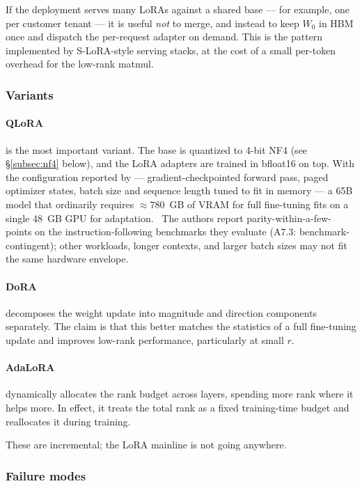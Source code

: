 If the deployment serves many LoRAs against a shared base --- for
example, one per customer tenant --- it is useful \emph{not} to
merge, and instead to keep $W_0$ in HBM once and dispatch the
per-request adapter on demand. This is the pattern implemented by
S-LoRA-style serving stacks, at the cost of a small per-token overhead
for the low-rank matmul.

\subsubsection{Variants}

\paragraph{QLoRA} \citep{dettmers2023qlora} is the most important
variant. The base is quantized to 4-bit NF4 (see \S\ref{subsec:nf4}
below), and the LoRA adapters are trained in bfloat16 on top. With
the configuration reported by \citet{dettmers2023qlora} ---
gradient-checkpointed forward pass, paged optimizer states, batch
size and sequence length tuned to fit in memory --- a 65B model
that ordinarily requires $\approx 780$~GB of VRAM for full
fine-tuning fits on a single 48~GB GPU for adaptation. \Emp\ The
authors report parity-within-a-few-points on the
instruction-following benchmarks they evaluate (A7.3:
benchmark-contingent); other workloads, longer contexts, and
larger batch sizes may not fit the same hardware envelope.

\paragraph{DoRA} \citep{liu2024dora} decomposes the weight update into
magnitude and direction components separately. The claim is that this
better matches the statistics of a full fine-tuning update and
improves low-rank performance, particularly at small $r$.

\paragraph{AdaLoRA} \citep{zhang2023adalora} dynamically allocates
the rank budget across layers, spending more rank where it helps
more. In effect, it treats the total rank as a fixed training-time
budget and reallocates it during training.

These are incremental; the LoRA mainline is not going anywhere.

\subsubsection{Failure modes}


